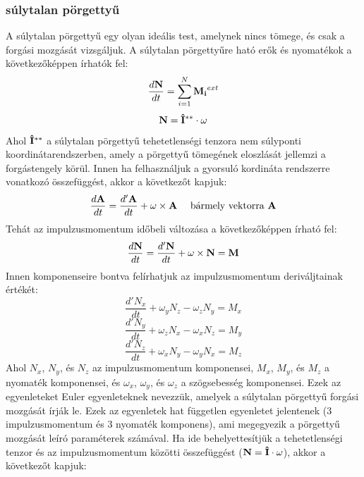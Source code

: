 \documentclass[../main.tex]{subfiles}
\begin{document}
\subsubsection*{súlytalan pörgettyű}
A súlytalan pörgettyű egy olyan ideális test, amelynek nincs tömege, és csak a forgási mozgását vizsgáljuk. A súlytalan pörgettyűre ható erők és nyomatékok a következőképpen írhatók fel:
\begin{equation}
\frac{d\bold{N}}{dt} = \sum_{i=1}^{N} \bold{M_i}^{ext}
\end{equation}
\begin{equation}
\bold{N} = \bold{\hat{I}^{**}} \cdot \bold{\omega}
\end{equation}
Ahol $\bold{\hat{I}^{**}}$ a súlytalan pörgettyű tehetetlenségi tenzora nem súlyponti koordinátarendszerben, amely a pörgettyű tömegének eloszlását jellemzi a forgástengely körül.
Innen ha felhasználjuk a gyorsuló kordináta rendszerre vonatkozó összefüggést, akkor a következőt kapjuk:
\begin{equation}
    \frac{d\bold{A}}{dt} = \frac{d'\bold{A}}{dt} + \bold{\omega} \times \bold{A} \quad \text{ bármely vektorra } \bold{A}
\end{equation}
Tehát az impulzusmomentum időbeli változása a következőképpen írható fel:
\begin{equation}
    \frac{d\bold{N}}{dt} = \frac{d'\bold{N}}{dt} + \bold{\omega} \times \bold{N} = \bold{M}
\end{equation}
Innen komponenseire bontva felírhatjuk az impulzusmomentum deriváljtainak értékét:
\begin{equation}
    \frac{d'N_x}{dt} + \omega_y N_z - \omega_z N_y = M_x
\end{equation}
\begin{equation}
    \frac{d'N_y}{dt} + \omega_z N_x - \omega_x N_z = M_y
\end{equation}
\begin{equation}
    \frac{d'N_z}{dt} + \omega_x N_y - \omega_y N_x = M_z
\end{equation}
Ahol $N_x$, $N_y$, és $N_z$ az impulzusmomentum komponensei, $M_x$, $M_y$, és $M_z$ a nyomaték komponensei, és $\omega_x$, $\omega_y$, és $\omega_z$ a szögsebesség komponensei.
Ezek az egyenleteket Euler egyenleteknek nevezzük, amelyek a súlytalan pörgettyű forgási mozgását írják le. Ezek az egyenletek hat független egyenletet jelentenek (3 impulzusmomentum és 3 nyomaték komponens), ami megegyezik a pörgettyű mozgását leíró paraméterek számával.
Ha ide behelyettesítjük a tehetetlenségi tenzor és az impulzusmomentum közötti összefüggést ($\bold{N} = \bold{\hat{I}} \cdot \bold{\omega}$), akkor a következőt kapjuk:
\end{document}
